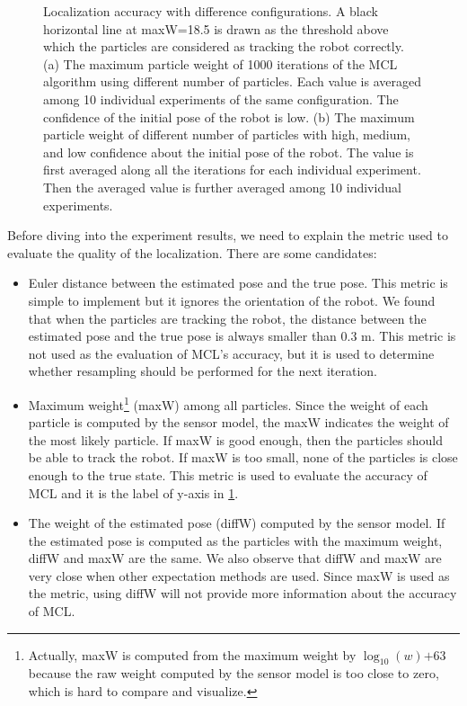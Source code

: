 \begin{figure}[!h]
  \hfil
  \caption{Localization accuracy with difference configurations.
    A black horizontal line at maxW=18.5 is drawn as the threshold above which the
    particles are considered as tracking the robot correctly.
    (a) The maximum particle weight of 1000 iterations of the MCL algorithm
    using different number of particles. Each value is averaged among 10
    individual experiments of the same configuration. The confidence of the
    initial pose of the robot is low.
    (b) The maximum particle weight of different number of particles with high,
    medium, and low confidence about the initial pose of the robot. The value is
    first averaged along all the iterations for each individual experiment. Then
    the averaged value is further averaged among 10 individual experiments.}
  \label{fig:maxW}
\end{figure}

Before diving into the experiment results, we need to explain the metric used to
evaluate the quality of the localization.
There are some candidates:
\begin{itemize}
\item Euler distance between the estimated pose and the true pose.
  This metric is simple to implement but it ignores the orientation of the robot.
  We found that when the particles are tracking the robot, the distance between
  the estimated pose and the true pose is always smaller than 0.3 m.
  This metric is not used as the evaluation of MCL's accuracy, but it is used to
  determine whether resampling should be performed for the next iteration.
\item Maximum weight\footnote{
    Actually, maxW is computed from the maximum weight by
    $\log_{10}(w) \text{+} 63$ because the raw weight computed by the sensor
    model is too close to zero, which is hard to compare and visualize.
  } (maxW) among all particles.
  Since the weight of each particle is computed by the sensor model, the maxW
  indicates the weight of the most likely particle.
  If maxW is good enough, then the particles should be able to track the robot.
  If maxW is too small, none of the particles is close enough to the true state.
  This metric is used to evaluate the accuracy of MCL and it is the label of
  y-axis in \Fig \ref{fig:maxW}.
\item The weight of the estimated pose (diffW) computed by the sensor model.
  If the estimated pose is computed as the particles with the maximum weight,
  diffW and maxW are the same.
  We also observe that diffW and maxW are very close when other expectation
  methods are used.
  Since maxW is used as the metric, using diffW will not provide more information
  about the accuracy of MCL.
\end{itemize}

